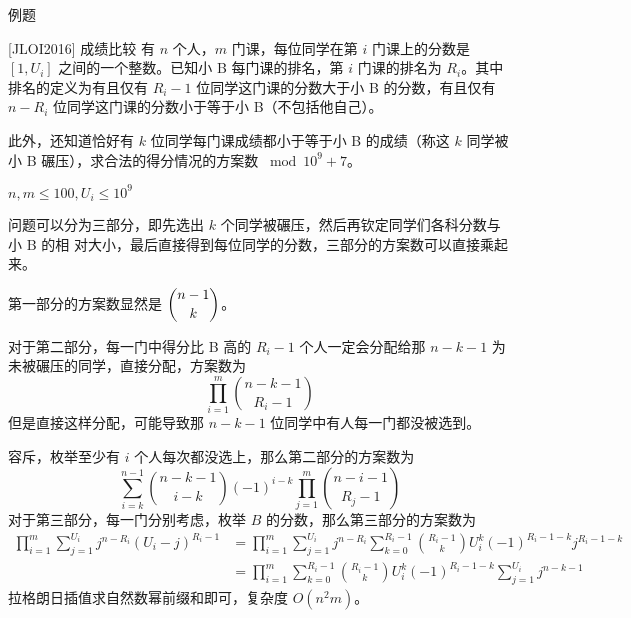 \documentclass[UTF8]{beamer}
\begin{document}
    \begin{frame}{例题}
        \begin{block}{[JLOI2016] 成绩比较}
            有 $n$ 个人，$m$ 门课，每位同学在第 $i$ 门课上的分数是 $[1,U_i]$ 之间的一个整数。已知小 B 每门课的排名，第 $i$ 门课的排名为 $R_i$。其中排名的定义为有且仅有 $R_i-1$ 位同学这门课的分数大于小 B 的分数，有且仅有 $n-R_i$ 位同学这门课的分数小于等于小 B（不包括他自己）。
            
            此外，还知道恰好有 $k$ 位同学每门课成绩都小于等于小 B 的成绩（称这 $k$ 同学被小 B 碾压），求合法的得分情况的方案数 $\bmod 10^9+7$。

            $n,m\le 100,U_i\le 10^9$
        \end{block}
        \pause

        问题可以分为三部分，即先选出 $k$ 个同学被碾压，然后再钦定同学们各科分数与小 B 的相
对大小，最后直接得到每位同学的分数，三部分的方案数可以直接乘起来。

第一部分的方案数显然是 $\dbinom{n-1}{k}$。
    \end{frame}

    \begin{frame}
        对于第二部分，每一门中得分比 B 高的 $R_i-1$ 个人一定会分配给那 $n-k-1$ 为未被碾压的同学，直接分配，方案数为
        \vspace{-0.1em}
        $$
        \prod_{i=1}^m\binom{n-k-1}{R_i-1}
        $$
        \vspace{-0.1em}
        但是直接这样分配，可能导致那 $n-k-1$ 位同学中有人每一门都没被选到。

        容斥，枚举至少有 $i$ 个人每次都没选上，那么第二部分的方案数为
        \vspace{-0.1em}
        $$
        \sum_{i=k}^{n-1}\binom{n-k-1}{i-k}(-1)^{i-k}\prod_{j=1}^m\binom{n-i-1}{R_j-1}
        $$
        \vspace{-0.1em}
        \pause
        对于第三部分，每一门分别考虑，枚举 $B$ 的分数，那么第三部分的方案数为
        \vspace{-0.1em}
        $$
        \begin{aligned}
        \prod_{i=1}^m \sum_{j=1}^{U_i}j^{n-R_i}(U_i-j)^{R_i-1}
        &=\prod_{i=1}^m\sum_{j=1}^{U_i}j^{n-R_i}\sum_{k=0}^{R_i-1}\binom{R_i-1}{k}U_i^k(-1)^{R_i-1-k}j^{R_i-1-k}\\
        &=\prod_{i=1}^m\sum_{k=0}^{R_i-1}\binom{R_i-1}{k}U_i^k(-1)^{R_i-1-k}\sum_{j=1}^{U_i} j^{n-k-1}
        \end{aligned}
        $$
        \vspace{-0.1em}
        拉格朗日插值求自然数幂前缀和即可，复杂度 $O(n^2m)$。
    \end{frame}
    
\end{document}
